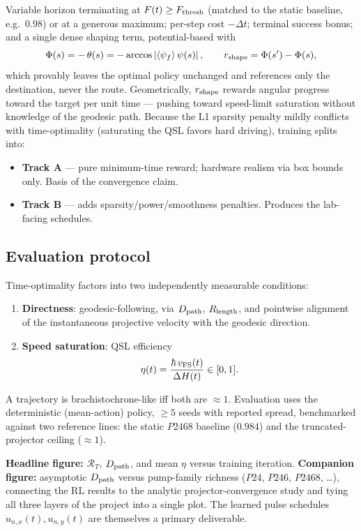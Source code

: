 \documentclass[11pt]{article}
\begin{document}
Variable horizon terminating at $F(t) \ge F_{\rm thresh}$ (matched to the static baseline, e.g.\ $0.98$) or at a generous maximum; per-step cost $-\Delta t$; terminal success bonus; and a single dense shaping term, potential-based with
\begin{equation}
\Phi(s) = -\,\theta(s) = -\arccos\left|\braket{\psi_f}{\psi(s)}\right|,
\qquad r_{\rm shape} = \Phi(s') - \Phi(s),
\end{equation}
which provably leaves the optimal policy unchanged and references only the destination, never the route. Geometrically, $r_{\rm shape}$ rewards angular progress toward the target per unit time --- pushing toward speed-limit saturation without knowledge of the geodesic path. Because the L1 sparsity penalty mildly conflicts with time-optimality (saturating the QSL favors hard driving), training splits into:
\begin{itemize}
  \item \textbf{Track A} --- pure minimum-time reward; hardware realism via box bounds only. Basis of the convergence claim.
  \item \textbf{Track B} --- adds sparsity/power/smoothness penalties. Produces the lab-facing schedules.
\end{itemize}

\subsection*{Evaluation protocol}

Time-optimality factors into two independently measurable conditions:
\begin{enumerate}
  \item \textbf{Directness}: geodesic-following, via $D_{\rm path}$, $R_{\rm length}$, and pointwise alignment of the instantaneous projective velocity with the geodesic direction.
  \item \textbf{Speed saturation}: QSL efficiency
  \begin{equation}
  \eta(t) = \frac{\hbar\, v_{\rm FS}(t)}{\Delta H(t)} \in [0,1].
  \end{equation}
\end{enumerate}
A trajectory is brachistochrone-like iff both are $\approx 1$. Evaluation uses the deterministic (mean-action) policy, $\ge 5$ seeds with reported spread, benchmarked against two reference lines: the static $P2468$ baseline ($0.984$) and the truncated-projector ceiling ($\approx 1$).

\textbf{Headline figure:} $\mathcal{R}_T$, $D_{\rm path}$, and mean $\eta$ versus training iteration. \textbf{Companion figure:} asymptotic $D_{\rm path}$ versus pump-family richness ($P24$, $P246$, $P2468$, \dots), connecting the RL results to the analytic projector-convergence study and tying all three layers of the project into a single plot. The learned pulse schedules $u_{n,x}(t), u_{n,y}(t)$ are themselves a primary deliverable.
\end{document}
